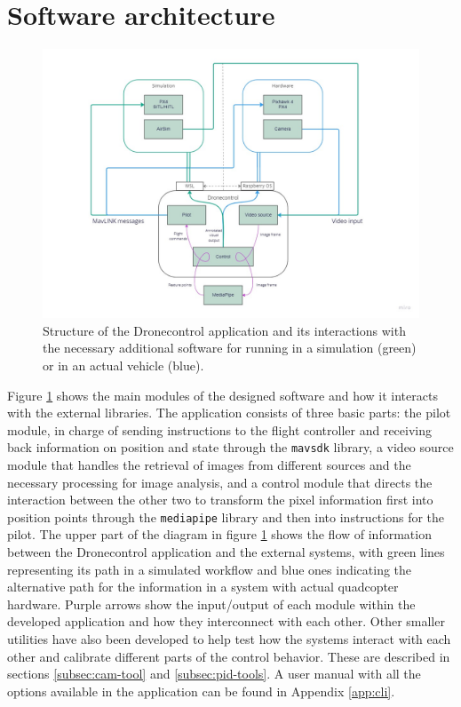 \section{Software architecture}

\begin{figure}
  \centering
  \includegraphics[width=\textwidth, keepaspectratio]{img/software-arch.jpg}
  \caption{Structure of the Dronecontrol application and its interactions with the necessary additional software for running in a simulation (green) or in an actual vehicle (blue).}\label{fig:architecture}
\end{figure}


Figure \ref{fig:architecture} shows the main modules of the designed software and how it interacts with the external libraries.
The application consists of three basic parts: 
the pilot module, in charge of sending instructions to the flight controller and receiving back information on position and state through the \texttt{mavsdk} library, 
a video source module that handles the retrieval of images from different sources and the necessary processing for image analysis,
and a control module that directs the interaction between the other two to transform the pixel information first into position points through the \texttt{mediapipe} library and then into instructions for the pilot.
The upper part of the diagram in figure \ref{fig:architecture} shows the flow of information between the Dronecontrol application and the external systems, with green lines representing its path in a simulated workflow and blue ones indicating the alternative path for the information in a system with actual quadcopter hardware.
Purple arrows show the input/output of each module within the developed application and how they interconnect with each other.
Other smaller utilities have also been developed to help test how the systems interact with each other and calibrate different parts of the control behavior.
These are described in sections \ref{subsec:cam-tool} and \ref{subsec:pid-tools}.
A user manual with all the options available in the application can be found in Appendix \ref{app:cli}.

